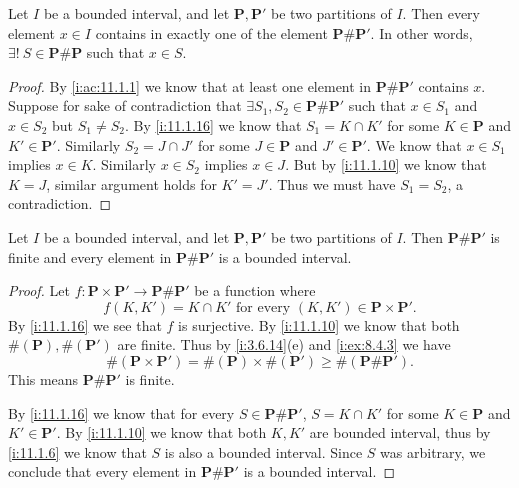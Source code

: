 \begin{ac}\label{i:ac:11.1.2}
  Let \(I\) be a bounded interval, and let \(\mathbf{P}, \mathbf{P}'\) be two partitions of \(I\).
  Then every element \(x \in I\) contains in exactly one of the element \(\mathbf{P} \# \mathbf{P}'\).
  In other words, \(\exists!\ S \in \mathbf{P} \# \mathbf{P}\) such that \(x \in S\).
\end{ac}

\begin{proof}
  By \cref{i:ac:11.1.1} we know that at least one element in \(\mathbf{P} \# \mathbf{P}'\) contains \(x\).
  Suppose for sake of contradiction that \(\exists S_1, S_2 \in \mathbf{P} \# \mathbf{P}'\) such that \(x \in S_1\) and \(x \in S_2\) but \(S_1 \neq S_2\).
  By \cref{i:11.1.16} we know that \(S_1 = K \cap K'\) for some \(K \in \mathbf{P}\) and \(K' \in \mathbf{P}'\).
  Similarly \(S_2 = J \cap J'\) for some \(J \in \mathbf{P}\) and \(J' \in \mathbf{P}'\).
  We know that \(x \in S_1\) implies \(x \in K\).
  Similarly \(x \in S_2\) implies \(x \in J\).
  But by \cref{i:11.1.10} we know that \(K = J\), similar argument holds for \(K' = J'\).
  Thus we must have \(S_1 = S_2\), a contradiction.
\end{proof}

\begin{ac}\label{i:ac:11.1.3}
  Let \(I\) be a bounded interval, and let \(\mathbf{P}, \mathbf{P}'\) be two partitions of \(I\).
  Then \(\mathbf{P} \# \mathbf{P}'\) is finite and every element in \(\mathbf{P} \# \mathbf{P}'\) is a bounded interval.
\end{ac}

\begin{proof}
  Let \(f : \mathbf{P} \times \mathbf{P}' \to \mathbf{P} \# \mathbf{P}'\) be a function where
  \[
    f(K, K') = K \cap K' \text{ for every } (K, K') \in \mathbf{P} \times \mathbf{P}'.
  \]
  By \cref{i:11.1.16} we see that \(f\) is surjective.
  By \cref{i:11.1.10} we know that both \(\#(\mathbf{P}), \#(\mathbf{P}')\) are finite.
  Thus by \cref{i:3.6.14}(e) and \cref{i:ex:8.4.3} we have
  \[
    \#(\mathbf{P} \times \mathbf{P}') = \#(\mathbf{P}) \times \#(\mathbf{P}') \geq \#(\mathbf{P} \# \mathbf{P}').
  \]
  This means \(\mathbf{P} \# \mathbf{P}'\) is finite.

  By \cref{i:11.1.16} we know that for every \(S \in \mathbf{P} \# \mathbf{P}'\), \(S = K \cap K'\) for some \(K \in \mathbf{P}\) and \(K' \in \mathbf{P}'\).
  By \cref{i:11.1.10} we know that both \(K, K'\) are bounded interval, thus by \cref{i:11.1.6} we know that \(S\) is also a bounded interval.
  Since \(S\) was arbitrary, we conclude that every element in \(\mathbf{P} \# \mathbf{P}'\) is a bounded interval.
\end{proof}

